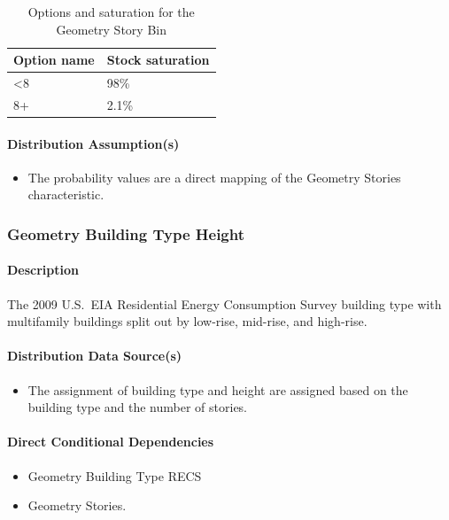 \begin{longtable}[]{@{}ll@{}}
\caption{Options and saturation for the Geometry Story Bin}  \\
\toprule\noalign{}
Option name & Stock saturation \\
\midrule\noalign{}
\endhead
\bottomrule\noalign{}
\endlastfoot
\textless8 & 98\% \\
8+ & 2.1\% \\
\end{longtable}


\paragraph{Distribution Assumption(s)}
\begin{itemize}
    \item The probability values are a direct mapping of the Geometry Stories characteristic.
\end{itemize}

\subsubsection{Geometry Building Type Height}
\paragraph{Description}
The 2009 U.S.~EIA Residential Energy Consumption Survey building type with multifamily buildings split out by low-rise, mid-rise, and high-rise.

\paragraph{Distribution Data Source(s)}
\begin{itemize}
    \item The assignment of building type and height are assigned based on the building type and the number of stories.
\end{itemize}

\paragraph{Direct Conditional Dependencies}
\begin{itemize}
    \item Geometry Building Type RECS
    \item Geometry Stories.
\end{itemize}

